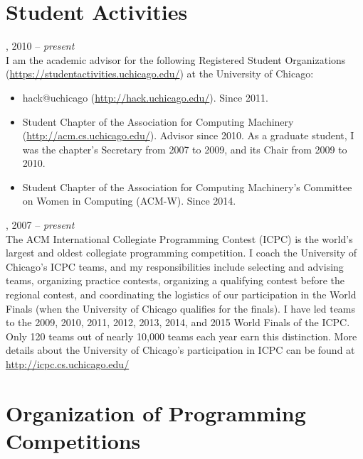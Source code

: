 \documentclass{resume}
\begin{document}
\pagebreak

\section*{\hspace{-1cm}Student Activities}

\begin{category}{}
, 2010 -- \emph{present}\\
I am the academic advisor for the following Registered Student Organizations (\url{https://studentactivities.uchicago.edu/}) at the University of Chicago:
\begin{itemize}
 \item hack@uchicago (\url{http://hack.uchicago.edu/}). Since 2011.
 \item Student Chapter of the Association for Computing Machinery (\url{http://acm.cs.uchicago.edu/}). Advisor since 2010. As a graduate student, I was the chapter's Secretary from 2007 to 2009, and its Chair from 2009 to 2010.
 \item Student Chapter of the Association for Computing Machinery's Committee on Women in Computing (ACM-W). Since 2014.
\end{itemize}
, 2007 -- \emph{present}\\
The ACM International Collegiate Programming Contest (ICPC) is the world's largest and oldest collegiate programming competition. I coach the University of Chicago's ICPC teams, and my responsibilities include selecting and advising teams, organizing practice contests, organizing a qualifying contest before the regional contest, and coordinating the logistics of our participation in the World Finals (when the University of Chicago qualifies for the finals). I have led teams to the 2009, 2010, 2011, 2012, 2013, 2014, and 2015 World Finals of the ICPC. Only 120 teams out of nearly 10,000 teams each year earn this distinction. More details about the University of Chicago's participation in ICPC can be found at \url{http://icpc.cs.uchicago.edu/}
\end{category}


\section*{\hspace{-1cm}Organization of Programming Competitions}
\end{document}
